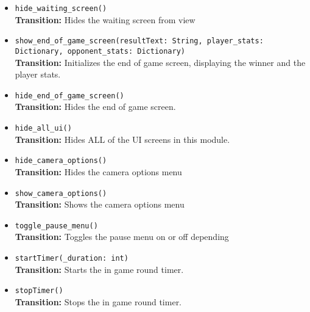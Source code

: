 \documentclass[12pt, titlepage]{article}
\begin{document}
\begin{itemize}
	\item \texttt{hide\_waiting\_screen() } \\
	\textbf{Transition:} Hides the waiting screen from view
	
	\item \texttt{show\_end\_of\_game\_screen(resultText: String, player\_stats: Dictionary, opponent\_stats: Dictionary) } \\
	\textbf{Transition:} Initializes the end of game screen, displaying the winner and the player stats.
	
	\item \texttt{hide\_end\_of\_game\_screen() } \\
	\textbf{Transition:} Hides the end of game screen.
	
	\item \texttt{hide\_all\_ui() } \\
	\textbf{Transition:} Hides ALL of the UI screens in this module.
	
	\item \texttt{hide\_camera\_options()  }\\
	\textbf{Transition:} Hides the camera options menu
	
	\item \texttt{show\_camera\_options()  }\\
	\textbf{Transition:} Shows the camera options menu
	
	\item \texttt{toggle\_pause\_menu() }\\
	\textbf{Transition:} Toggles the pause menu on or off depending 
	
	\item \texttt{startTimer(\_duration: int)  }\\
	\textbf{Transition:} Starts the in game round timer.
	
	\item \texttt{stopTimer() }\\
	\textbf{Transition:} Stops the in game round timer.
	

\end{itemize}
\end{document}
